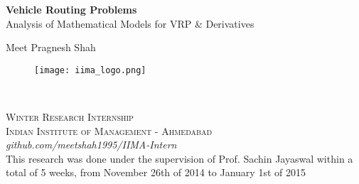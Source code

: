 \documentclass[11pt,fleqn]{book} %
\begin{document}

\begingroup
\thispagestyle{empty}
\centering
\vspace*{5cm}
\par\normalfont\fontsize{35}{35}\sffamily\selectfont
\textbf{Vehicle Routing Problems}\\
{\LARGE Analysis of Mathematical Models for VRP \& Derivatives}\par %
\vspace*{1cm}
{\Huge Meet Pragnesh Shah}\par %
\endgroup


\newpage

\begin{figure}[h]
    \centering
    \texttt{[image: iima\_logo.png]}
    \end{figure}
    
~\vfill
\thispagestyle{empty}



\noindent \textsc{Winter Research Internship}\\

\noindent \textsc{Indian Institute of Management - Ahmedabad}\\

\noindent \textit{github.com/meetshah1995/IIMA-Intern}\\

\noindent This research was done under the supervision of Prof. Sachin Jayaswal within a total of 5 weeks, from November 26th of 2014 to January 1st of 2015\\ %


\end{document}
